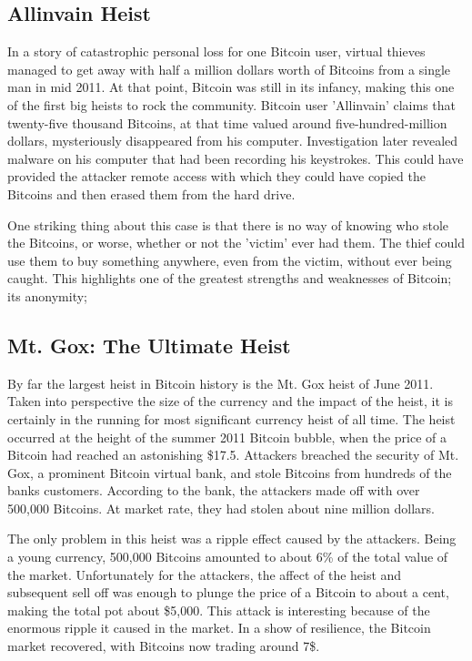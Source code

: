 \documentclass{report}
\begin{document}
\subsection*{Allinvain Heist}
In a story of catastrophic personal loss for one Bitcoin user, virtual thieves managed 
to get away with half a million dollars worth of Bitcoins from a single man in mid 2011\cite{Worstoll:Allinvain}.
At that point, Bitcoin was still in its infancy, making this one of the first big heists 
to rock the community.  Bitcoin user 'Allinvain' claims that twenty-five thousand Bitcoins,
at that time valued around five-hundred-million dollars, mysteriously disappeared from 
his computer.  Investigation later revealed malware on his computer that had been recording
his keystrokes.  This could have provided the attacker remote access with which they could
have copied the Bitcoins and then erased them from the hard drive.

One striking thing about this case is that there is no way of knowing who stole the Bitcoins, 
or worse, whether or not the 'victim' ever had them.  The thief could use them to buy 
something anywhere, even from the victim, without ever being caught.  This highlights one 
of the greatest strengths and weaknesses of Bitcoin; its anonymity;

\subsection*{Mt. Gox: The Ultimate Heist}
By far the largest heist in Bitcoin history is the Mt. Gox heist of June 2011\cite{Rashid:MtGox}.  Taken into
perspective the size of the currency and the impact of the heist, it is certainly in the
running for most significant currency heist of all time.  The heist occurred at the height
of the summer 2011 Bitcoin bubble, when the price of a Bitcoin had reached an astonishing
\$17.5.  Attackers breached the security of Mt. Gox, a prominent Bitcoin virtual bank,
and stole Bitcoins from hundreds of the banks customers.  According to the bank, the attackers
made off with over 500,000 Bitcoins.  At market rate, they had stolen about nine million
dollars.

The only problem in this heist was a ripple effect caused by the attackers.  Being a young
currency, 500,000 Bitcoins amounted to about 6\% of the total value of the market.
Unfortunately for the attackers, the affect of the heist and subsequent sell off was enough
to plunge the price of a Bitcoin to about a cent, making the total pot about \$5,000.  This
attack is interesting because of the enormous ripple it caused in the market.  In a show of
resilience, the Bitcoin market recovered, with Bitcoins now trading around 7\$.
\end{document}
